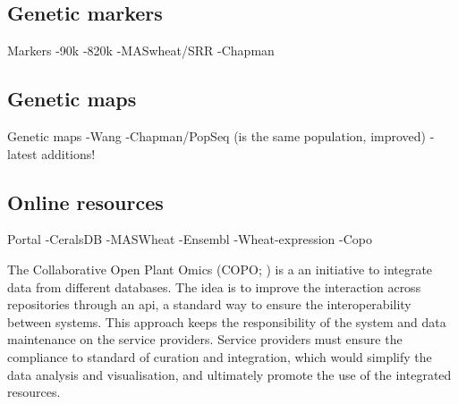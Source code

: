\subsection{Genetic markers}


Markers
-90k \citep{Wang2014}
-820k \citep{Winfield2016}
-MASwheat/SRR
-Chapman 

\subsection{Genetic maps}
Genetic maps
-Wang \citet{Wang2014} 
-Chapman/PopSeq (is the same population, improved)
-latest additions! \citep{Allen2016,Winfield2016}

\subsection{Online resources}
Portal
-CeralsDB
-MASWheat
-Ensembl
-Wheat-expression
-Copo

The Collaborative Open Plant Omics (COPO; \citealt{Davey2015}) is a an initiative to integrate data from different databases. 
The idea is to improve the interaction across repositories through an \gls{api}, a standard way to ensure the interoperability between systems. 
This approach keeps the responsibility of the system and data maintenance on the service providers. 
Service providers must ensure the compliance to standard of curation and integration, which would simplify the data analysis and visualisation, and ultimately promote the use of the integrated resources.  










